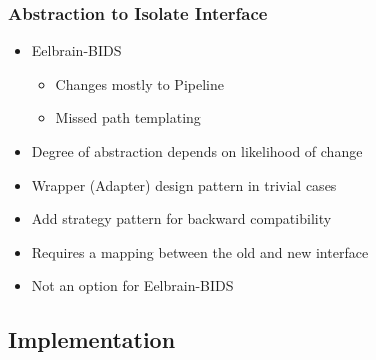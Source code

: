 \documentclass{beamer}
\begin{document}

\begin{frame}

\frametitle{Abstraction to Isolate Interface}

\begin{itemize}

\item Eelbrain-BIDS
\begin{itemize}
  \item Changes mostly to Pipeline
  \item Missed path templating
\end{itemize}
\item Degree of abstraction depends on likelihood of change
\item Wrapper (Adapter) design pattern in trivial cases
\item Add strategy pattern for backward compatibility
\item Requires a mapping between the old and new interface
\item Not an option for Eelbrain-BIDS %

\end{itemize}

\end{frame}


\subsection[Implement]{Implementation}

\end{document}
